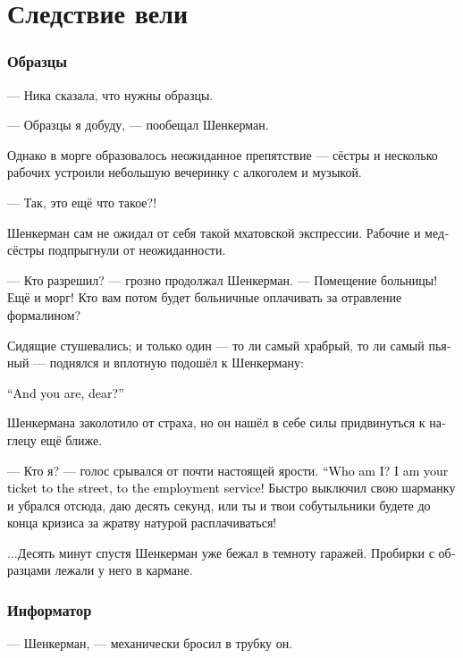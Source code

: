 \documentclass[a5paper,12pt,fleqn]{extbook}\usepackage{cooltooltips}\usepackage{polyglossia}\setdefaultlanguage[babelshorthands=true]{russian}\setotherlanguage{english}\defaultfontfeatures{Ligatures=TeX,Mapping=tex-text} \usepackage{xcolor}\definecolor{lightgray}{HTML}{bbbbbb}\color{lightgray}\newcommand{\ml}[3]{\textenglish{\textcolor{black}{#3}}}
\newcommand{\textspace}{\vspace{1em}{\centering\Large\bfseries<...>\par}\vspace{1em}}
\begin{document}
\chapter{Следствие вели}

\subsection{Образцы}

--- Ника сказала, что нужны образцы.

--- Образцы я добуду, --- пообещал Шенкерман.

\textspace

Однако в морге образовалось неожиданное препятствие --- сёстры и несколько рабочих устроили небольшую вечеринку с алкоголем и музыкой.

--- Так, это ещё что такое?!

Шенкерман сам не ожидал от себя такой мхатовской экспрессии.
Рабочие и медсёстры подпрыгнули от неожиданности.

--- Кто разрешил? --- грозно продолжал Шенкерман.
--- Помещение больницы!
Ещё и морг!
Кто вам потом будет больничные оплачивать за отравление формалином?

Сидящие стушевались;
и только один --- то ли самый храбрый, то ли самый пьяный --- поднялся и вплотную подошёл к Шенкерману:

\ml{$0$}
{--- А ты кто такой будешь, уважаемый?}
{``And you are, dear?''}

Шенкермана заколотило от страха, но он нашёл в себе силы придвинуться к наглецу ещё ближе.

--- Кто я? --- голос срывался от почти настоящей ярости.
\ml{$0$}
{--- Кто я такой?}
{``Who am I?}
\ml{$0$}
{Я --- твой билет на улицу, в службу занятости населения!}
{I am your ticket to the street, to the employment service!}
Быстро выключил свою шарманку и убрался отсюда, даю десять секунд, или ты и твои собутыльники будете до конца кризиса за жратву натурой расплачиваться!

...Десять минут спустя Шенкерман уже бежал в темноту гаражей.
Пробирки с образцами лежали у него в кармане.

\subsection{Информатор}

--- Шенкерман, --- механически бросил в трубку он.
\end{document}
